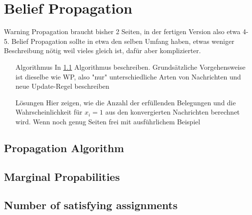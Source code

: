 \section{Belief Propagation} \label{BP}

Warning Propagation braucht bisher 2 Seiten, in der fertigen Version also etwa 4-5. Belief Propagation sollte in etwa den selben Umfang haben, etwas weniger Beschreibung nötig weil vieles gleich ist, dafür aber komplizierter.

\begin{itemize}

\item[Algorithmus] In \ref{BPA} Algorithmus beschreiben. Grundsätzliche  Vorgehensweise ist dieselbe wie WP, also "nur" unterschiedliche Arten von Nachrichten und neue Update-Regel beschreiben

\item[Lösungen] Hier zeigen, wie  die Anzahl der erfüllenden Belegungen und die Wahrscheinlichkeit für $x_i = 1$ aus den konvergierten Nachrichten berechnet wird. Wenn noch genug Seiten frei mit ausführlichem Beispiel

\end{itemize}

\subsection{Propagation Algorithm} \label{BPA}


\subsection{Marginal Propabilities}

\subsection{Number of satisfying assignments}